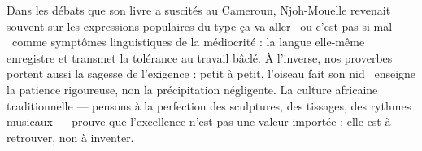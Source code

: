 \documentclass[11pt]{article}
\begin{document}
\begin{savaistu}
Dans les débats que son livre a suscités au Cameroun, Njoh-Mouelle revenait souvent sur les expressions populaires du type \guillemotleft ça va aller \guillemotright\ ou \guillemotleft c'est pas si mal \guillemotright\ comme symptômes linguistiques de la médiocrité : la langue elle-même enregistre et transmet la tolérance au travail bâclé. À l'inverse, nos proverbes portent aussi la sagesse de l'exigence : \guillemotleft petit à petit, l'oiseau fait son nid \guillemotright\ enseigne la patience rigoureuse, non la précipitation négligente. La culture africaine traditionnelle — pensons à la perfection des sculptures, des tissages, des rythmes musicaux — prouve que l'excellence n'est pas une valeur importée : elle est à retrouver, non à inventer.
\end{savaistu}
\end{document}
